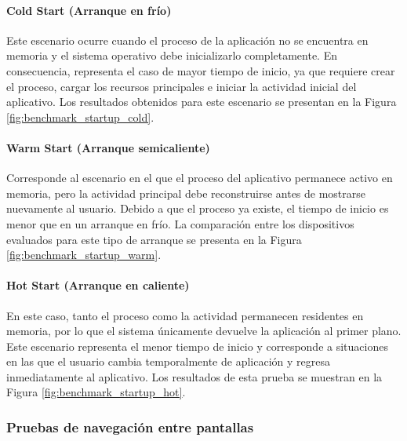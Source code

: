             \paragraph{Cold Start (Arranque en frío)}

                Este escenario ocurre cuando el proceso de la aplicación no se encuentra en memoria y el sistema operativo debe inicializarlo completamente. En consecuencia, representa el caso de mayor tiempo de inicio, ya que requiere crear el proceso, cargar los recursos principales e iniciar la actividad inicial del aplicativo. Los resultados obtenidos para este escenario se presentan en la Figura \ref{fig:benchmark_startup_cold}.

                

            \paragraph{Warm Start (Arranque semicaliente)}

                Corresponde al escenario en el que el proceso del aplicativo permanece activo en memoria, pero la actividad principal debe reconstruirse antes de mostrarse nuevamente al usuario. Debido a que el proceso ya existe, el tiempo de inicio es menor que en un arranque en frío. La comparación entre los dispositivos evaluados para este tipo de arranque se presenta en la Figura \ref{fig:benchmark_startup_warm}.

                

            \paragraph{Hot Start (Arranque en caliente)}

                En este caso, tanto el proceso como la actividad permanecen residentes en memoria, por lo que el sistema únicamente devuelve la aplicación al primer plano. Este escenario representa el menor tiempo de inicio y corresponde a situaciones en las que el usuario cambia temporalmente de aplicación y regresa inmediatamente al aplicativo. Los resultados de esta prueba se muestran en la Figura \ref{fig:benchmark_startup_hot}.

                

        \subsubsection{Pruebas de navegación entre pantallas}

